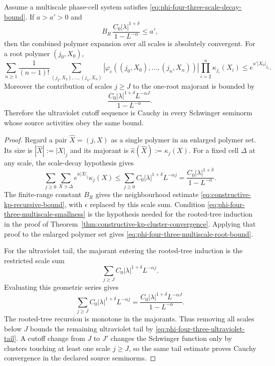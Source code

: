 \begin{theorem}
\label{thm:phi-four-three-abstract-multiscale-summability}
Assume a multiscale phase-cell system satisfies
\eqref{eq:phi-four-three-scale-decay-bound}.  If \(a>a'>0\) and
\begin{equation}
  B_R\,\frac{C_0|\lambda|^{1+\delta}}{1-L^{-\alpha}}
  \leq a',
  \label{eq:phi-four-three-multiscale-smallness}
\end{equation}
then the combined polymer expansion over all scales is absolutely
convergent.  For a root polymer \((j_0,X_0)\),
\begin{equation}
  \sum_{n\geq1}\frac1{(n-1)!}
  \sum_{(j_2,X_2),\ldots,(j_n,X_n)}
  |\varphi_{\mathrm c}((j_0,X_0),\ldots,(j_n,X_n))|
  \prod_{i=2}^n\kappa_{j_i}(X_i)
  \leq
  e^{a'|X_0|_{j_0}} .
  \label{eq:phi-four-three-multiscale-root-bound}
\end{equation}
Moreover the contribution of scales \(j\geq J\) to the one-root majorant is
bounded by
\begin{equation}
  \frac{C_0|\lambda|^{1+\delta}L^{-\alpha J}}
  {1-L^{-\alpha}} .
  \label{eq:phi-four-three-ultraviolet-tail}
\end{equation}
Therefore the ultraviolet cutoff sequence is Cauchy in every Schwinger
seminorm whose source activities obey the same bound.
\end{theorem}

\begin{proof}
Regard a pair \(\widehat X=(j,X)\) as a single polymer in an enlarged
polymer set.  Its size is \(|\widehat X|:=|X|_j\) and its majorant is
\(\widehat\kappa(\widehat X):=\kappa_j(X)\).  For a fixed cell \(\Delta\)
at any scale, the scale-decay hypothesis gives
\[
  \sum_{j\geq0}\sum_{X\ni\Delta}
  e^{a|X|_j}\kappa_j(X)
  \leq
  \sum_{j\geq0}
  C_0|\lambda|^{1+\delta}L^{-\alpha j}
  =
  \frac{C_0|\lambda|^{1+\delta}}{1-L^{-\alpha}}.
\]
The finite-range constant \(B_R\) gives the neighbourhood estimate
\eqref{eq:constructive-kp-recursive-bound}, with \(\epsilon\) replaced by
this scale sum.  Condition \eqref{eq:phi-four-three-multiscale-smallness}
is the hypothesis needed for the rooted-tree induction in the proof of
Theorem~\ref{thm:constructive-kp-cluster-convergence}.  Applying that proof
to the enlarged polymer set gives
\eqref{eq:phi-four-three-multiscale-root-bound}.

For the ultraviolet tail, the majorant entering the rooted-tree induction is
the restricted scale sum
\[
  \sum_{j\geq J} C_0|\lambda|^{1+\delta}L^{-\alpha j}.
\]
Evaluating this geometric series gives
\[
  \sum_{j\geq J} C_0|\lambda|^{1+\delta}L^{-\alpha j}
  =
  \frac{C_0|\lambda|^{1+\delta}L^{-\alpha J}}
  {1-L^{-\alpha}} .
\]
The rooted-tree recursion is monotone in the majorants.  Thus removing all
scales below \(J\) bounds the remaining ultraviolet tail by
\eqref{eq:phi-four-three-ultraviolet-tail}.  A cutoff change from \(J\) to
\(J'\) changes the Schwinger function only by clusters touching at least one
scale \(j\geq J\), so the same tail estimate proves Cauchy convergence in
the declared source seminorms.
\end{proof}


